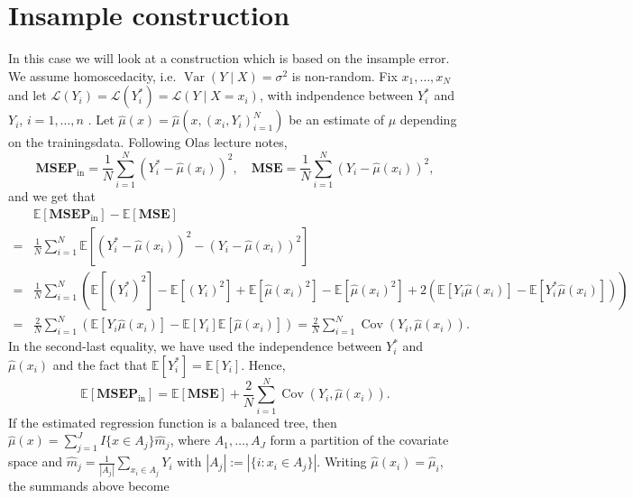 \documentclass{article}
\theoremstyle{definition}
\theoremstyle{remark}
\newcommand{\E }{\mathbb{E}}  %
\newcommand{\Cov}{\operatorname{Cov}}  %
\newcommand{\Var}{\operatorname{Var}}  %
\newcommand{\MSEPin}{\textbf{MSEP}_{\text{in}}}
\newcommand{\MSE}{\textbf{MSE}}
\begin{document}
\section{Insample construction}
In this case we will look at a construction which is based on the insample
error. We assume homoscedacity, i.e. $\Var(Y \mid X) = \sigma^2$ is non-random.
Fix $x_1, \dots, x_N$ and let $\mathcal{L}(Y_i) = \mathcal{L}(Y^*_i) = \mathcal{L}\left(Y \mid X = x_i \right)$, with indpendence between $Y^*_i$ and $Y_i$, $i =1, \dots, n$ . Let $\hat \mu (x) = \hat \mu(x, (x_i, Y_i)_{i=1}^N)$ be an estimate of $\mu$ depending on the trainingsdata. Following Olas lecture notes,
$$
	\MSEPin = \frac{1}{N} \sum_{i=1}^N (Y_i^* - \hat \mu(x_i))^2, \quad \MSE = \frac{1}{N} \sum_{i=1}^N (Y_i - \hat \mu(x_i))^2,
$$
and we get that
\begin{align*}
	  & \E[\MSEPin] - \E[\MSE]                                                                                                                                                                                           \\
	= & \frac{1}{N} \sum_{i=1}^N \E \left[(Y_i^* - \hat \mu(x_i))^2 - (Y_i - \hat \mu(x_i))^2 \right]                                                                                                                    \\
	= & \frac{1}{N} \sum_{i=1}^N \left( \E [(Y_i^*)^2] - \E [(Y_i)^2] + \E [\hat \mu(x_i)^2] - \E [\hat \mu(x_i)^2] + 2  \left(\E\left[ Y_i \hat \mu(x_i) \right] -  \E\left[ Y_i^* \hat \mu(x_i) \right]\right) \right) \\
	= & \frac{2}{N} \sum_{i=1}^N \left(  \E\left[ Y_i \hat \mu(x_i) \right] -  \E\left[ Y_i \right] \E \left[ \hat \mu(x_i) \right]\right)
	= \frac{2}{N} \sum_{i=1}^N \Cov(Y_i, \hat \mu(x_i)).
\end{align*}
In the second-last equality, we have used the independence between $Y_i^*$ and $\hat \mu(x_i)$ and the fact that $\E[Y_i^*] = \E[Y_i]$. Hence,
$$
	\E[\MSEPin] = \E[\MSE] +  \frac{2}{N} \sum_{i=1}^N \Cov(Y_i, \hat \mu(x_i)).
$$
If the estimated regression function is a balanced tree, then $\hat \mu(x) = \sum_{j=1}^J I\{x \in A_j\} \hat m_j$, where $A_1, \dots, A_J$ form a partition of the covariate space and $\hat m_j = \frac{1}{|A_{j}|} \sum_{x_i \in A_j} Y_i$ with $|A_j | := |\{i \colon x_i \in A_j\}|$. Writing $\hat \mu(x_i) = \hat \mu_i$, the summands above become
\end{document}
